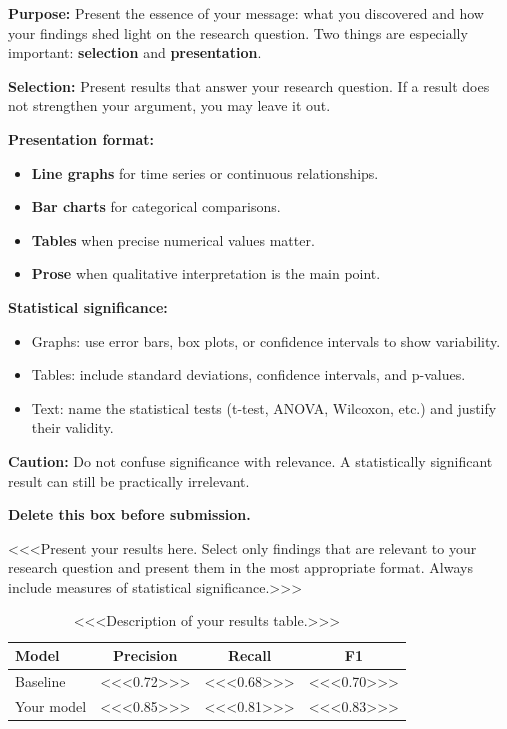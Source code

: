 \documentclass[12pt,a4paper,twocolumn]{article}
\begin{document}
\begin{guidancebox}
\textbf{Purpose:} Present the essence of your message: what you
discovered and how your findings shed light on the research question.
Two things are especially important: \textbf{selection} and \textbf{presentation}.

\textbf{Selection:} Present results that answer your research question.
If a result does not strengthen your argument, you may leave it out.

\textbf{Presentation format:}
\begin{itemize}[leftmargin=*, nosep]
  \item \textbf{Line graphs} for time series or continuous relationships.
  \item \textbf{Bar charts} for categorical comparisons.
  \item \textbf{Tables} when precise numerical values matter.
  \item \textbf{Prose} when qualitative interpretation is the main point.
\end{itemize}

\textbf{Statistical significance:}
\begin{itemize}[leftmargin=*, nosep]
  \item Graphs: use error bars, box plots, or confidence intervals to
    show variability.
  \item Tables: include standard deviations, confidence intervals, and
    p-values.
  \item Text: name the statistical tests (t-test, ANOVA, Wilcoxon, etc.)
    and justify their validity.
\end{itemize}

\textbf{Caution:} Do not confuse significance with relevance. A
statistically significant result can still be practically irrelevant.

\textbf{Delete this box before submission.}
\end{guidancebox}

\noindent
<<<Present your results here. Select only findings that are relevant to
your research question and present them in the most appropriate format.
Always include measures of statistical significance.>>>

\begin{table}[t]
  \caption{<<<Description of your results table.>>>}
  \label{tab:results}
  \centering
  \small
  \begin{tabular}{@{}lccc@{}}
    \toprule
    \textbf{Model}  & \textbf{Precision} & \textbf{Recall} & \textbf{F1} \\
    \midrule
    Baseline         & <<<0.72>>>         & <<<0.68>>>      & <<<0.70>>>  \\
    Your model       & <<<0.85>>>         & <<<0.81>>>      & <<<0.83>>>  \\
    \bottomrule
  \end{tabular}
\end{table}
\end{document}

